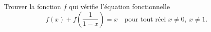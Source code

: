 Trouver la fonction $f$ qui vérifie l'équation fonctionnelle
\[ f(x) + f\left(\frac{1}{1 - x}\right) = x \quad\text{pour tout réel } x \neq 0,\ x \neq 1. \]

